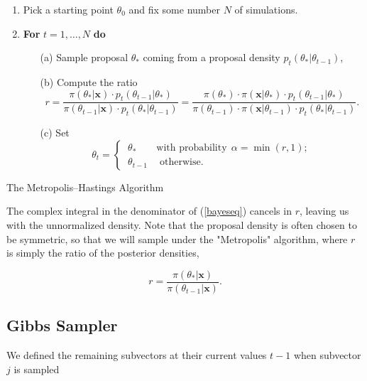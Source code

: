 \begin{algorithm}[H]
	\SetAlgoLined
	\begin{enumerate}
		\item Pick a starting point $\theta_0$ and fix some number $N$ of simulations.
		\item \textbf{For} $t=1,\dots,N$ \quad \textbf{do}
		\begin{itemize}
			\item[(a)] Sample proposal $\theta_*$ coming from a proposal density $p_t(\theta_*|\theta_{t-1})$,
			\item[(b)] Compute the ratio
			\begin{equation*}
			r = \frac{\pi(\theta_*|\boldsymbol{x})\cdot p_t(\theta_{t-1}|\theta_*)}{\pi(\theta_{t-1}|\boldsymbol{x})\cdot p_t(\theta_*|\theta_{t-1})} = \frac{\pi(\theta_*)\cdot \pi(\boldsymbol{x}|\theta_*)\cdot p_t(\theta_{t-1}|\theta_*)}{\pi(\theta_{t-1})\cdot \pi(\boldsymbol{x}|\theta_{t-1})\cdot p_t(\theta_*|\theta_{t-1})}.
			\end{equation*}
			\item[(c)] Set 
			\begin{equation*}
			\theta_t= 			\begin{cases} \ \theta_* \qquad \text{with probability} \ \  \alpha=\min (r,1); \\
			\ \theta_{t-1} \ \quad \text{otherwise}.
			\end{cases}
			\end{equation*}
		\end{itemize}
	\end{enumerate}
	\caption{The Metropolis–Hastings Algorithm}\label{algo:mh}
\end{algorithm}
The complex integral in the denominator of (\ref{bayeseq}) cancels in $r$,  leaving us with the unnormalized density.
Note that the proposal density is often chosen to be symmetric, so that we will sample under the "Metropolis" algorithm, where $r$ is simply the ratio of the posterior densities,

\begin{equation} r=\frac{\pi(\theta_*|\boldsymbol{x}) }{\pi(\theta_{t-1}|\boldsymbol{x})}.
\end{equation}


\subsection{Gibbs Sampler}\label{app:gibbs}

We defined the remaining subvectors at their current values $t-1$ when subvector $j$ is sampled 


